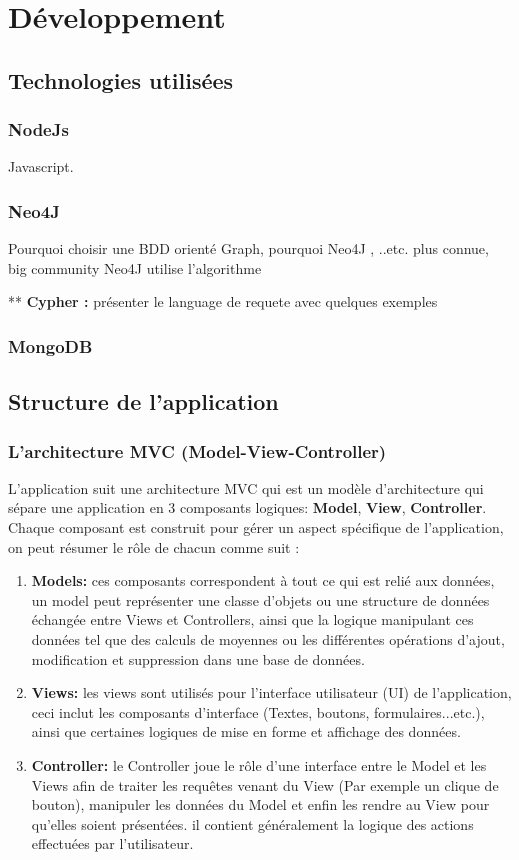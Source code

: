 \chapter{Développement}
\section{Technologies utilisées}
\subsection{NodeJs}
Javascript.
\subsection{Neo4J}
Pourquoi choisir une BDD orienté Graph, pourquoi Neo4J , ..etc.
plus connue, big community
Neo4J utilise l'algorithme 

** \textbf{Cypher : } présenter le language de requete avec quelques exemples
\subsection{MongoDB}
		
\section{Structure de l'application}
	\subsection{L'architecture MVC (Model-View-Controller)}
	L'application suit une architecture MVC qui est un modèle d'architecture qui sépare une application en 3 composants logiques: \textbf{Model}, \textbf{View}, \textbf{Controller}.
	Chaque composant est construit pour gérer un aspect spécifique de l'application, on peut résumer le rôle de chacun comme suit :
	\begin{enumerate}
	\item \textbf{Models: } ces composants correspondent à tout ce qui est relié aux données, un model peut représenter une classe d'objets ou une structure de données échangée entre Views et Controllers, ainsi que la logique manipulant ces données tel que des calculs de moyennes ou les différentes opérations d'ajout, modification et suppression dans une base de données.
	\item \textbf{Views:} les views sont utilisés pour l'interface utilisateur (UI) de l'application, ceci inclut les composants d'interface (Textes, boutons, formulaires...etc.), ainsi que certaines logiques de mise en forme et affichage des données.
	\item \textbf{Controller: } le Controller joue le rôle d'une interface entre le Model et les Views afin de traiter les requêtes venant du View (Par exemple un clique de bouton), manipuler les données du Model et enfin les rendre au View pour qu'elles soient présentées. il contient généralement la logique des actions effectuées par l'utilisateur.
	\end{enumerate}
	
